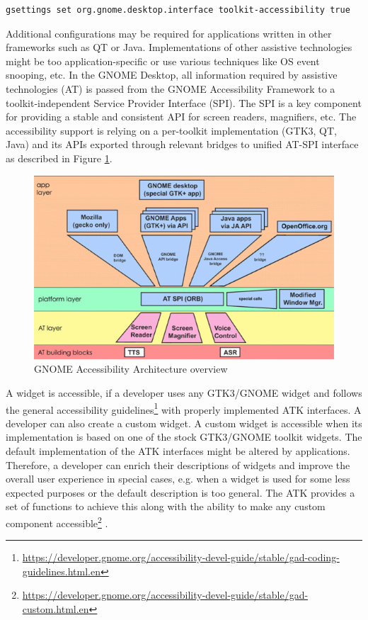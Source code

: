 \begin{lstlisting}[numbers=none,caption={Enabling accessibility via a \texttt{gsettings} command},label={gsettings}]
gsettings set org.gnome.desktop.interface toolkit-accessibility true
\end{lstlisting}

Additional configurations may be required for applications written in other frameworks such as QT or Java. Implementations of other assistive technologies might be too application-specific or use various techniques like OS event snooping, etc. In the GNOME Desktop, all information required by assistive technologies (AT) is passed from the GNOME Accessibility Framework to a toolkit-independent Service Provider Interface (SPI). The SPI is a key component for providing a stable and consistent API for screen readers, magnifiers, etc. The accessibility support is relying on a per-toolkit implementation (GTK3, QT, Java) and its APIs exported through relevant bridges to unified AT-SPI interface as described in Figure \ref{ATSPI_architecture}.

\begin{figure}[hbt]
	\centering
	\includegraphics[width=1\textwidth]{obrazky-figures/GNOME_desktop_Accessibility.png}
	\caption{GNOME Accessibility Architecture overview\cite{gnomeADG}}
	\label{ATSPI_architecture}
\end{figure}

A widget is accessible, if a developer uses any GTK3/GNOME widget and follows the general accessibility guidelines\footnote{\url{https://developer.gnome.org/accessibility-devel-guide/stable/gad-coding-guidelines.html.en}} with properly implemented ATK interfaces. A developer can also create a custom widget. A custom widget is accessible when its implementation is based on one of the stock GTK3/GNOME toolkit widgets. The default implementation of the ATK interfaces might be altered by applications. Therefore, a developer can enrich their descriptions of widgets and improve the overall user experience in special cases, e.g. when a widget is used for some less expected purposes or the default description is too general. The ATK provides a set of functions to achieve this along with the ability to make any custom component accessible\footnote{\url{https://developer.gnome.org/accessibility-devel-guide/stable/gad-custom.html.en}} \cite{accessibleWidgets}.


